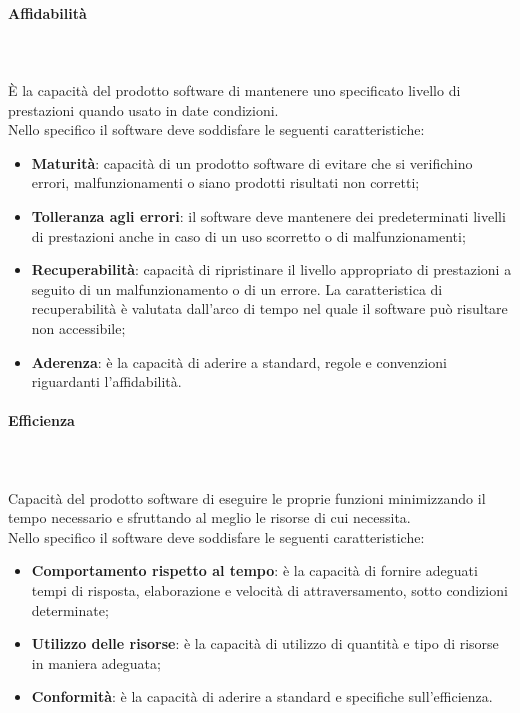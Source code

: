 \paragraph{Affidabilità}\mbox{} \\ \mbox{} \\
È la capacità del prodotto software di mantenere uno specificato livello di prestazioni quando usato in date condizioni. \\
Nello specifico il software deve soddisfare le seguenti caratteristiche:
\begin{itemize}
	\item \textbf{Maturità}: capacità di un prodotto software di evitare che si verifichino errori, malfunzionamenti o siano prodotti risultati non corretti;
	\item \textbf{Tolleranza agli errori}: il software deve mantenere dei predeterminati livelli di prestazioni anche in caso di un uso scorretto o di malfunzionamenti;
	\item \textbf{Recuperabilità}: capacità di ripristinare il livello appropriato di prestazioni a seguito di un malfunzionamento o di un errore. La caratteristica di recuperabilità è valutata dall'arco di tempo nel quale il software può risultare non accessibile;
	\item \textbf{Aderenza}: è la capacità di aderire a standard, regole e convenzioni riguardanti l'affidabilità.
\end{itemize}
\paragraph{Efficienza}\mbox{} \\ \mbox{} \\
Capacità del prodotto software di eseguire le proprie funzioni minimizzando il tempo necessario e sfruttando al meglio le risorse di cui necessita. \\
Nello specifico il software deve soddisfare le seguenti caratteristiche:
\begin{itemize}
	\item \textbf{Comportamento rispetto al tempo}: è la capacità di fornire adeguati tempi di risposta, elaborazione e velocità di attraversamento, sotto condizioni determinate;
	\item \textbf{Utilizzo delle risorse}: è la capacità di utilizzo di quantità e tipo di risorse in maniera adeguata;
	\item \textbf{Conformità}: è la capacità di aderire a standard e specifiche sull'efficienza\glo.
\end{itemize}
